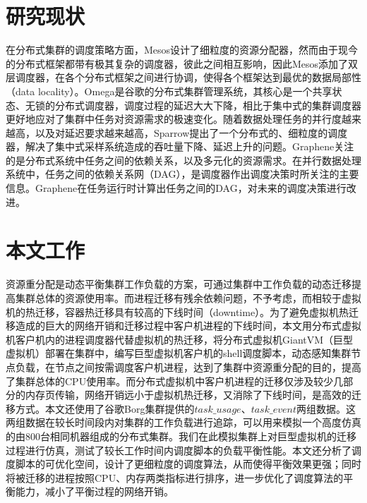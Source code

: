 \section{研究现状}
\label{chap:dissch}
在分布式集群的调度策略方面，Mesos\cite{mesos}设计了细粒度的资源分配器，然而由于现今的分布式框架都带有极其复杂的调度器，彼此之间相互影响，因此Mesos添加了双层调度器，在各个分布式框架之间进行协调，使得各个框架达到最优的数据局部性（data locality）。Omega\cite{omega}是谷歌的分布式集群管理系统，其核心是一个共享状态、无锁的分布式调度器，调度过程的延迟大大下降，相比于集中式的集群调度器更好地应对了集群中任务对资源需求的极速变化。随着数据处理任务的并行度越来越高，以及对延迟要求越来越高，Sparrow\cite{sparrow}提出了一个分布式的、细粒度的调度器，解决了集中式采样系统造成的吞吐量下降、延迟上升的问题。Graphene\cite{graphene}关注的是分布式系统中任务之间的依赖关系，以及多元化的资源需求。在并行数据处理系统中，任务之间的依赖关系网（DAG），是调度器作出调度决策时所关注的主要信息。Graphene在任务运行时计算出任务之间的DAG，对未来的调度决策进行改进。

\section{本文工作}
资源重分配是动态平衡集群工作负载的方案，可通过集群中工作负载的动态迁移提高集群总体的资源使用率。而进程迁移有残余依赖问题，不予考虑，而相较于虚拟机的热迁移，容器热迁移具有较高的下线时间（downtime）。为了避免虚拟机热迁移造成的巨大的网络开销和迁移过程中客户机进程的下线时间，本文用分布式虚拟机客户机内的进程调度器代替虚拟机的热迁移，将分布式虚拟机GiantVM（巨型虚拟机）部署在集群中，编写巨型虚拟机客户机的shell调度脚本，动态感知集群节点负载，在节点之间按需调度客户机进程，达到了集群中资源重分配的目的，提高了集群总体的CPU使用率。而分布式虚拟机中客户机进程的迁移仅涉及较少几部分的内存页传输，网络开销远小于虚拟机热迁移，又消除了下线时间，是高效的迁移方式。本文还使用了谷歌Borg集群提供的$task\_usage$、$task\_event$两组数据。这两组数据在较长时间段内对集群的工作负载进行追踪，可以用来模拟一个高度仿真的由800台相同机器组成的分布式集群。我们在此模拟集群上对巨型虚拟机的迁移过程进行仿真，测试了较长工作时间内调度脚本的负载平衡性能。本文还分析了调度脚本的可优化空间，设计了更细粒度的调度算法，从而使得平衡效果更强；同时将被迁移的进程按照CPU、内存两类指标进行排序，进一步优化了调度算法的平衡能力，减小了平衡过程的网络开销。


